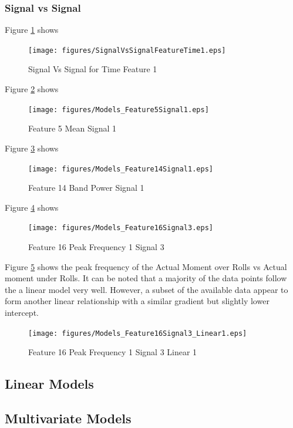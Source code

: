 \documentclass[]{article}
\begin{document}
\subsubsection*{Signal vs Signal}
Figure \ref{fig:SignalVsSignalFeatureTime1} shows 
\begin{figure}[H]
    \centering
    \texttt{[image: figures/SignalVsSignalFeatureTime1.eps]}
    \caption{Signal Vs Signal for Time Feature 1}
    \label{fig:SignalVsSignalFeatureTime1}
\end{figure}


Figure \ref{fig:Models_Feature5Signal1} shows 
\begin{figure}[H]
    \centering
    \texttt{[image: figures/Models\_Feature5Signal1.eps]}
    \caption{Feature 5 Mean Signal 1}
    \label{fig:Models_Feature5Signal1}
\end{figure}


Figure \ref{fig:Models_Feature14Signal1} shows 
\begin{figure}[H]
    \centering
    \texttt{[image: figures/Models\_Feature14Signal1.eps]}
    \caption{Feature 14 Band Power Signal 1}
    \label{fig:Models_Feature14Signal1}
\end{figure}

Figure \ref{fig:Models_Feature16Signal3} shows 
\begin{figure}[H]
    \centering
    \texttt{[image: figures/Models\_Feature16Signal3.eps]}
    \caption{Feature 16 Peak Frequency 1 Signal 3}
    \label{fig:Models_Feature16Signal3}
\end{figure}

Figure \ref{fig:Models_Feature16Signal3_Linear1} shows the peak frequency of the Actual Moment over Rolls vs Actual moment under Rolls. It can be noted that a majority of the data points follow the a linear model very well. However, a subset of the available data appear to form another linear relationship with a similar gradient but slightly lower intercept.
\begin{figure}[H]
    \centering
    \texttt{[image: figures/Models\_Feature16Signal3\_Linear1.eps]}
    \caption{Feature 16 Peak Frequency 1 Signal 3 Linear 1}
    \label{fig:Models_Feature16Signal3_Linear1}
\end{figure}

\subsection{Linear Models}

\subsection{Multivariate Models}
\end{document}
